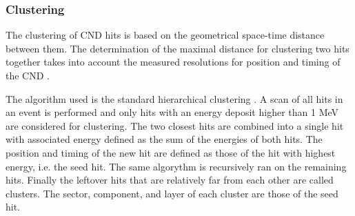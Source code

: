 \subsubsection{Clustering}
The clustering of CND hits is based on the geometrical space-time distance between them. The determination of the maximal distance for clustering two hits together takes into account the measured resolutions for position and timing of the CND \cite{cnd-nim}.

 The algorithm used is the standard hierarchical clustering \cite{Day1984}. A scan of all hits in an event is performed and only hits with an energy deposit higher than 1 MeV are considered for clustering. The two closest hits are combined into a single hit with associated energy defined as the sum of the energies of both hits. The position and timing of the new hit are defined as those of the hit with highest energy, i.e. the seed hit. The same algorythm is recursively ran on the remaining hits. Finally the leftover hits that are relatively far from each other are called clusters. The sector, component, and layer of each cluster are those of the seed hit.
